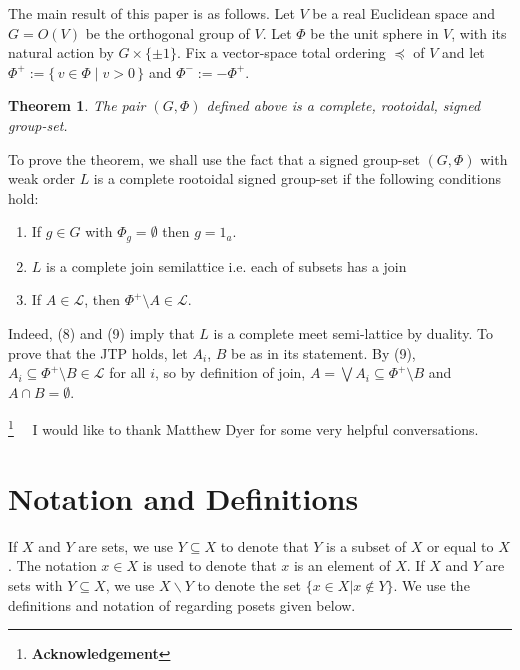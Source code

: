 \documentclass[psamsfonts]{amsart}
\numberwithin{equation}{subsection}
\theoremstyle{plain}
\newtheorem{theorem}{Theorem}[section]
\theoremstyle{definition}
\theoremstyle{remark}
\begin{document}
        
          The main result of this paper is as follows. Let $V$ be a real Euclidean space and 
       $G=O(V)$ be the orthogonal  group of $V$. Let $\Phi$ be the unit sphere in $V$, with its natural action by $G\times\{\pm 1\}$.
       Fix a vector-space total ordering $\preceq$ of $V$ and let $\Phi^{+}:=\{\, v\in \Phi\mid v>0\,\}$ and $\Phi^{-}:=-\Phi^{+}$.
       \begin{theorem} The pair $(G,\Phi)$ defined above is a complete, rootoidal, signed group-set.\end{theorem}     
       
       
 
       
 To prove the theorem,  we shall use the fact that  a signed group-set  $(G,\Phi)$ with weak order $L$ is a complete rootoidal signed group-set if  the following conditions hold:
    \begin{enumerate}\item[(7)] If $g\in {G}$ with $\Phi_{g}=\emptyset$ then $g=1_{a}$.
    \item[(8)]  $L$ is a complete join  semilattice i.e. each of  subsets  has a join 
     \item[(9)] If $A\in \mathcal{L}$, then $\Phi^{+}\setminus A\in \mathcal{L}$.
       \end{enumerate}       
 Indeed, (8) and (9) imply that $L$ is a complete meet semi-lattice by duality.    To prove   that the JTP holds,    let $A_{i}$, $B$ be as in its statement. By (9), $A_{i}\subseteq \Phi^{+}\setminus B\in \mathcal{L}$ for all $i$, so by definition of join, $A=\bigvee A_{i}\subseteq \Phi^{+}\setminus B$ and $A\cap B=\emptyset$.
       
        
       


\noindent
\thanks {\bf Acknowledgement}  \ \ 
I would like to thank Matthew Dyer for some very helpful conversations.  

\section{Notation and Definitions}\label{intro}
If $X$ and $Y$ are sets, we use  $Y \subseteq X$ to denote that $Y$ is a subset  of $X$ or equal to $X$.  The notation $x \in X$ is used to denote that 
$x$ is  an element of $X$. 
If $X$ and $Y$ are sets with $Y \subseteq X$, we use  $X\backslash Y$ to denote the set $\{x \in X | x \not\in Y\}$. 
We use the definitions and notation of \cite{DnP} regarding posets given below. 
\end{document}
